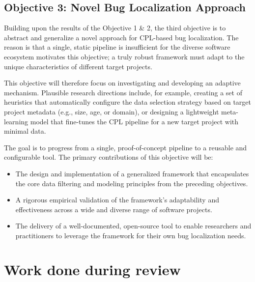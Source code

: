 \documentclass[12pt,table,xcdraw]{article}
\begin{document}
\subsection{Objective 3: Novel Bug Localization Approach}
\label{subsec: obj3}
Building upon the results of the Objective 1 \& 2, the third objective is to abstract and generalize a novel approach for CPL-based bug localization. The reason is that a single, static pipeline is insufficient for the diverse software ecosystem motivates this objective; a truly robust framework must adapt to the unique characteristics of different target projects.

This objective will therefore focus on investigating and developing an adaptive mechanism. Plausible research directions include, for example, creating a set of heuristics that automatically configure the data selection strategy based on target project metadata (e.g., size, age, or domain), or designing a lightweight meta-learning model that fine-tunes the CPL pipeline for a new target project with minimal data.

The goal is to progress from a single, proof-of-concept pipeline to a reusable and configurable tool. The primary contributions of this objective will be:
\begin{itemize}
    \item The design and implementation of a generalized framework that encapsulates the core data filtering and modeling principles from the preceding objectives.
    \item A rigorous empirical validation of the framework's adaptability and effectiveness across a wide and diverse range of software projects.
    \item The delivery of a well-documented, open-source tool to enable researchers and practitioners to leverage the framework for their own bug localization needs.
\end{itemize}


\section{Work done during review}
\end{document}
